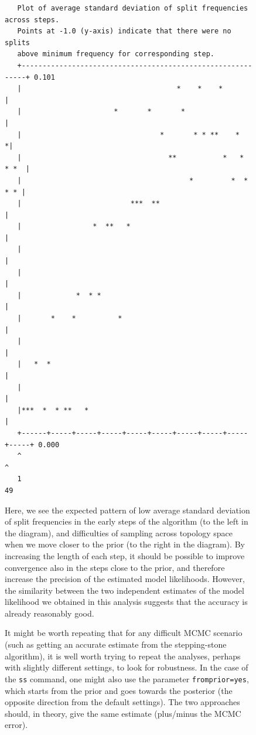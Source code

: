 \documentclass[12pt]{book}
\newcommand{\ttt}[1]{\texttt{#1}}
\begin{document}
\begin{figure}[h]
\footnotesize
\begin{singlespacing}
\begin{verbatim}
   Plot of average standard deviation of split frequencies across steps.
   Points at -1.0 (y-axis) indicate that there were no splits
   above minimum frequency for corresponding step.
   +------------------------------------------------------------+ 0.101
   |                                     *    *    *            |
   |                      *       *       *                     |
   |                                 *       * * **    *       *|
   |                                   **           *   *  * *  |
   |                                        *         *  *  * * |
   |                          ***  **                           |
   |                 *  **   *                                  |
   |                                                            |
   |                                                            |
   |             *  * *                                         |
   |       *    *          *                                    |
   |                                                            |
   |   *  *                                                     |
   |                                                            |
   |***  *  * **   *                                            |
   +------+-----+-----+-----+-----+-----+-----+-----+-----+-----+ 0.000
   ^                                                            ^
   1                                                           49
\end{verbatim}
\end{singlespacing}
\normalsize

Here, we see the expected pattern of low average standard deviation of split frequencies in the
early steps of the algorithm (to the left in the diagram), and difficulties of sampling across
topology space when we move closer to the prior (to the right in the diagram). By increasing the
length of each step, it should be possible to improve convergence also in the steps close to the
prior, and therefore increase the precision of the estimated model likelihoods. However, the
similarity between the two independent estimates of the model likelihood we obtained in this
analysis suggests that the accuracy is already reasonably good.

It might be worth repeating that for any difficult MCMC scenario (such as getting an accurate
estimate from the stepping-stone algorithm), it is well worth trying to repeat the analyses,
perhaps with slightly different settings, to look for robustness. In the case of the \ttt{ss}
command, one might also use the parameter \ttt{fromprior=yes}, which starts from the prior and goes
towards the posterior (the opposite direction from the default settings). The two approaches
should, in theory, give the same estimate (plus/minus the MCMC error).


\end{figure}
\end{document}

